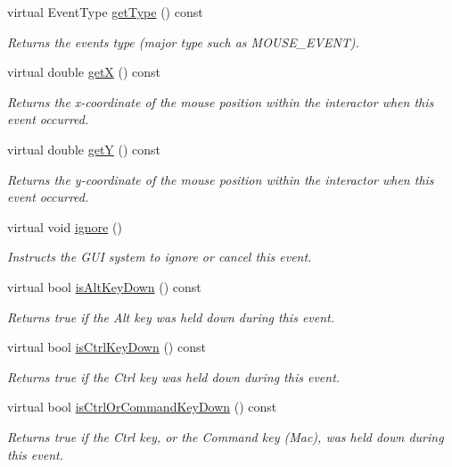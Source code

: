 \begin{DoxyCompactItemize}
virtual Event\+Type \mbox{\hyperlink{classGEvent_adfcd587f82f4340eaef5404f2cf6795c}{get\+Type}} () const
\begin{DoxyCompactList}\small\item\em Returns the event\textquotesingle{}s type (major type such as M\+O\+U\+S\+E\+\_\+\+E\+V\+E\+NT). \end{DoxyCompactList}\item 
virtual double \mbox{\hyperlink{classGEvent_a344385751bee0720059403940d57a13e}{getX}} () const
\begin{DoxyCompactList}\small\item\em Returns the x-\/coordinate of the mouse position within the interactor when this event occurred. \end{DoxyCompactList}\item 
virtual double \mbox{\hyperlink{classGEvent_aafa51c7f8f38a09febbb9ce7853f77b4}{getY}} () const
\begin{DoxyCompactList}\small\item\em Returns the y-\/coordinate of the mouse position within the interactor when this event occurred. \end{DoxyCompactList}\item 
virtual void \mbox{\hyperlink{classGEvent_a1d8bbef538fb750723bcc8f3cbc77720}{ignore}} ()
\begin{DoxyCompactList}\small\item\em Instructs the G\+UI system to ignore or cancel this event. \end{DoxyCompactList}\item 
virtual bool \mbox{\hyperlink{classGEvent_ac5cfd7d64f7bc3d43c4ce4326f213ab5}{is\+Alt\+Key\+Down}} () const
\begin{DoxyCompactList}\small\item\em Returns {\ttfamily true} if the Alt key was held down during this event. \end{DoxyCompactList}\item 
virtual bool \mbox{\hyperlink{classGEvent_a32ebd8661e615f5fbe15322b3423e06c}{is\+Ctrl\+Key\+Down}} () const
\begin{DoxyCompactList}\small\item\em Returns {\ttfamily true} if the Ctrl key was held down during this event. \end{DoxyCompactList}\item 
virtual bool \mbox{\hyperlink{classGEvent_a96b51557188c36392073bf1a5f92d610}{is\+Ctrl\+Or\+Command\+Key\+Down}} () const
\begin{DoxyCompactList}\small\item\em Returns {\ttfamily true} if the Ctrl key, or the Command key (Mac), was held down during this event. \end{DoxyCompactList}\item 

\end{DoxyCompactItemize}
